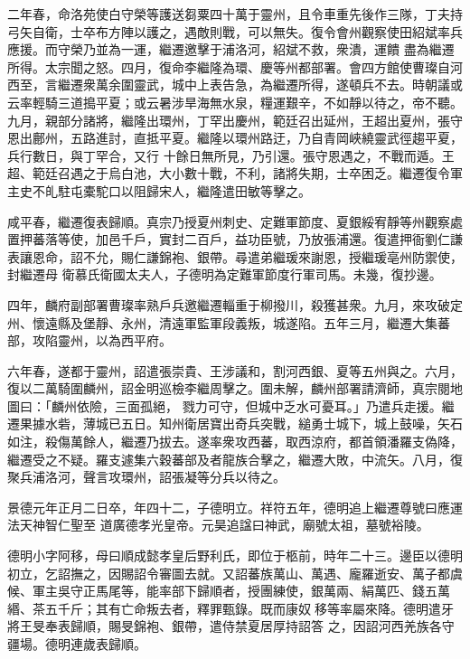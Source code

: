 \begin{pinyinscope}
 二年春，命洛苑使白守榮等護送芻粟四十萬于靈州，且令車重先後作三隊，丁夫持弓矢自衛，士卒布方陣以護之，遇敵則戰，可以無失。復令會州觀察使田紹斌率兵應援。而守榮乃並為一運，繼遷邀擊于浦洛河，紹斌不救，衆潰，運饋
 盡為繼遷所得。太宗聞之怒。四月，復命李繼隆為環、慶等州都部署。會四方館使曹璨自河西至，言繼遷衆萬余圍靈武，城中上表告急，為繼遷所得，遂頓兵不去。時朝議或云率輕騎三道搗平夏；或云暑涉旱海無水泉，糧運艱辛，不如靜以待之，帝不聽。九月，親部分諸將，繼隆出環州，丁罕出慶州，範廷召出延州，王超出夏州，張守恩出鄜州，五路進討，直抵平夏。繼隆以環州路迂，乃自青岡峽繞靈武徑趨平夏，兵行數日，與丁罕合，又行
 十餘日無所見，乃引還。張守恩遇之，不戰而遁。王超、範廷召遇之于烏白池，大小數十戰，不利，諸將失期，士卒困乏。繼遷復令軍主史不癿駐屯橐駝口以阻歸宋人，繼隆遣田敏等擊之。



 咸平春，繼遷復表歸順。真宗乃授夏州刺史、定難軍節度、夏銀綏宥靜等州觀察處置押蕃落等使，加邑千戶，實封二百戶，益功臣號，乃放張浦還。復遣押衙劉仁謙表讓恩命，詔不允，賜仁謙錦袍、銀帶。尋遣弟繼瑗來謝恩，授繼瑗亳州防禦使，封繼遷母
 衛慕氏衛國太夫人，子德明為定難軍節度行軍司馬。未幾，復抄邊。



 四年，麟府副部署曹璨率熟戶兵邀繼遷輜重于柳撥川，殺獲甚衆。九月，來攻破定州、懷遠縣及堡靜、永州，清遠軍監軍段義叛，城遂陷。五年三月，繼遷大集蕃部，攻陷靈州，以為西平府。



 六年春，遂都于靈州，詔遣張崇貴、王涉議和，割河西銀、夏等五州與之。六月，復以二萬騎圍麟州，詔金明巡檢李繼周擊之。圍未解，麟州部署請濟師，真宗閱地圖曰：「麟州依險，三面孤絕，
 戮力可守，但城中乏水可憂耳。」乃遣兵走援。繼遷果據水砦，薄城已五日。知州衛居寶出奇兵突戰，縋勇士城下，城上鼓噪，矢石如注，殺傷萬餘人，繼遷乃拔去。遂率衆攻西蕃，取西涼府，都首領潘羅支偽降，繼遷受之不疑。羅支遽集六穀蕃部及者龍族合擊之，繼遷大敗，中流矢。八月，復聚兵浦洛河，聲言攻環州，詔張凝等分兵以待之。



 景德元年正月二日卒，年四十二，子德明立。祥符五年，德明追上繼遷尊號曰應運法天神智仁聖至
 道廣德孝光皇帝。元昊追諡曰神武，廟號太祖，墓號裕陵。



 德明小字阿移，母曰順成懿孝皇后野利氏，即位于柩前，時年二十三。邊臣以德明初立，乞詔撫之，因賜詔令審圖去就。又詔蕃族萬山、萬遇、龐羅逝安、萬子都虞候、軍主吳守正馬尾等，能率部下歸順者，授團練使，銀萬兩、絹萬匹、錢五萬緡、茶五千斤；其有亡命叛去者，釋罪甄錄。既而康奴𡗀移等率屬來降。德明遣牙將王旻奉表歸順，賜旻錦袍、銀帶，遣侍禁夏居厚持詔答
 之，因詔河西羌族各守疆場。德明連歲表歸順。




\end{pinyinscope}
